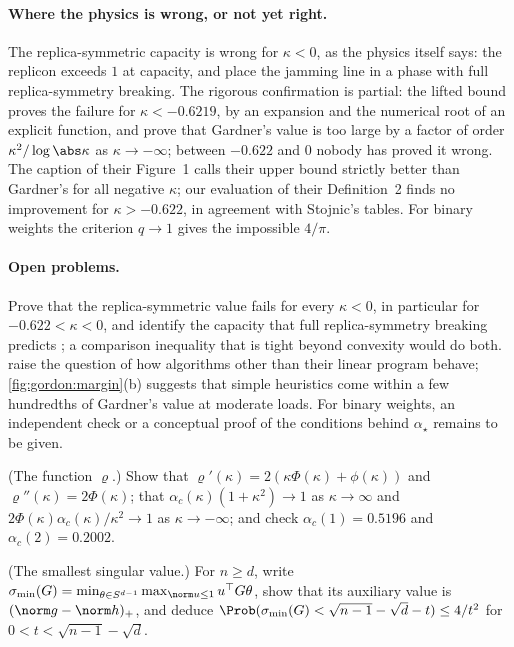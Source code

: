 \begin{refsection}
\paragraph{Where the physics is wrong, or not yet right.} The replica-symmetric capacity is wrong for $\kappa<0$, as the physics itself says: the replicon exceeds $1$ at capacity, and \textcite{FranzEtAl2017} place the jamming line in a phase with full replica-symmetry breaking. The rigorous confirmation is partial: the lifted bound proves the failure for $\kappa<-0.6219$, by an expansion and the numerical root of an explicit function, and \textcite{MontanariZhongZhou2024} prove that Gardner's value is too large by a factor of order $\kappa^2/\log\abs\kappa$ as $\kappa\to-\infty$; between $-0.622$ and $0$ nobody has proved it wrong. The caption of their Figure~1 calls their upper bound strictly better than Gardner's for all negative $\kappa$; our evaluation of their Definition~2 finds no improvement for $\kappa>-0.622$, in agreement with Stojnic's tables. For binary weights the criterion $q\to1$ gives the impossible $4/\pi$.

\paragraph{Open problems.} Prove that the replica-symmetric value fails for every $\kappa<0$, in particular for $-0.622<\kappa<0$, and identify the capacity that full replica-symmetry breaking predicts \parencite{FranzEtAl2017}; a comparison inequality that is tight beyond convexity would do both. \Textcite{MontanariZhongZhou2024} raise the question of how algorithms other than their linear program behave; \cref{fig:gordon:margin}(b) suggests that simple heuristics come within a few hundredths of Gardner's value at moderate loads. For binary weights, an independent check or a conceptual proof of the conditions behind $\alpha_\star$ remains to be given.

\begin{exercises}
\item \consolidation (The function $\varrho$.) Show that $\varrho'(\kappa)=2(\kappa\Phi(\kappa)+\phi(\kappa))$ and $\varrho''(\kappa)=2\Phi(\kappa)$; that $\alpha_c(\kappa)(1+\kappa^2)\to1$ as $\kappa\to\infty$ and $2\Phi(\kappa)\alpha_c(\kappa)/\kappa^2\to1$ as $\kappa\to-\infty$; and check $\alpha_c(1)=0.5196$ and $\alpha_c(2)=0.2002$.\label{ex:gordon:rho}

\item \consolidation (The smallest singular value.) For $n\ge d$, write $\sigma_{\min}(G)=\min_{\theta\in S^{d-1}}\max_{\norm u\le1}u^\top G\theta$, show that its auxiliary value is $(\norm g-\norm h)_+$, and deduce $\Prob(\sigma_{\min}(G)<\sqrt{n-1}-\sqrt d-t)\le4/t^2$ for $0<t<\sqrt{n-1}-\sqrt d$.\label{ex:gordon:smin}


\end{exercises}
\end{refsection}
